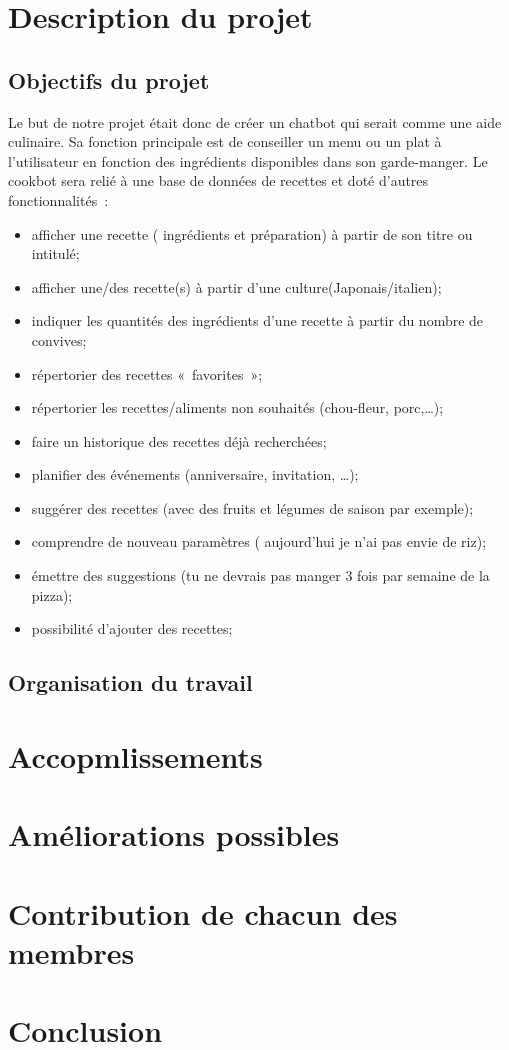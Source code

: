 \documentclass{report}
\begin{document}
\section{Description du projet}
\subsection{Objectifs du projet}
Le but de notre projet était donc de créer un chatbot qui serait comme une aide culinaire. Sa fonction principale est de conseiller un menu ou un plat à l'utilisateur en fonction des ingrédients disponibles dans son garde-manger. 
Le cookbot sera relié à une base de données de recettes et doté d'autres fonctionnalités : 
\begin{itemize}
\item afficher une recette ( ingrédients et préparation) à partir de son titre ou intitulé;
\item afficher une/des recette(s) à partir d'une culture(Japonais/italien);
\item indiquer les quantités des ingrédients d'une recette à partir du nombre de convives;
\item répertorier des recettes « favorites »;
\item répertorier les recettes/aliments non souhaités (chou-fleur, porc,…);
\item faire un historique des recettes déjà recherchées;
\item planifier des événements (anniversaire, invitation, …);
\item suggérer des recettes (avec des fruits et légumes de saison par exemple);
\item comprendre de nouveau paramètres ( aujourd'hui je n'ai pas envie de riz);
\item émettre des suggestions (tu ne devrais pas manger 3 fois par semaine de la pizza);
\item possibilité d'ajouter des recettes;
\end{itemize}
\subsection{Organisation du travail}

\section{Accopmlissements}
\section{Améliorations possibles}
\section{Contribution de chacun des membres}
\section*{Conclusion}
\end{document}
